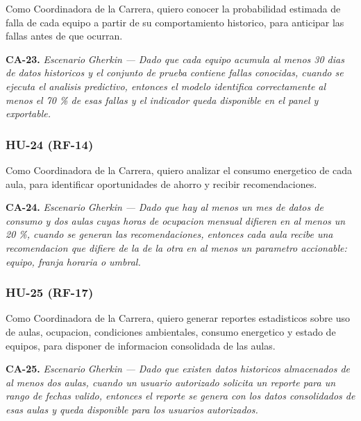 
Como Coordinadora de la Carrera, quiero conocer la probabilidad estimada de falla de cada equipo a partir de su comportamiento historico, para anticipar las fallas antes de que ocurran.


\textbf{CA-23.} \textit{Escenario }\textit{Gherkin}\textit{ --- Dado que cada equipo acumula al menos 30 dias de datos historicos y el conjunto de prueba contiene fallas conocidas, cuando se ejecuta el analisis predictivo, entonces el modelo identifica correctamente al menos el 70 \% de esas fallas y el indicador queda disponible en el panel y exportable.}

\subsubsection*{HU-24 (RF-14)}


Como Coordinadora de la Carrera, quiero analizar el consumo energetico de cada aula, para identificar oportunidades de ahorro y recibir recomendaciones.


\textbf{CA-24.} \textit{Escenario }\textit{Gherkin}\textit{ --- Dado que hay al menos un mes de datos de consumo y dos aulas cuyas horas de ocupacion mensual difieren en al menos un 20 \%, cuando se generan las recomendaciones, entonces cada aula recibe una recomendacion que difiere de la de la otra en al menos un parametro accionable: equipo, franja horaria o umbral.}

\subsubsection*{HU-25 (RF-17)}


Como Coordinadora de la Carrera, quiero generar reportes estadisticos sobre uso de aulas, ocupacion, condiciones ambientales, consumo energetico y estado de equipos, para disponer de informacion consolidada de las aulas.


\textbf{CA-25.} \textit{Escenario }\textit{Gherkin}\textit{ --- Dado que existen datos historicos almacenados de al menos dos aulas, cuando un usuario autorizado solicita un reporte para un rango de fechas valido, entonces el reporte se genera con los datos consolidados de esas aulas y queda disponible para los usuarios autorizados.}

